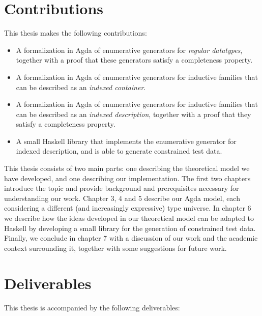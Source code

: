 \documentclass[a4paper,msc,twosized=semi]{uustthesis}
\let\oldemph\emph
\renewcommand\emph[1]{{\large\oldemph{#1}}}
\begin{document}
\section{Contributions}

  This thesis makes the following contributions: 

  \begin{itemize}
    \item 
      A formalization in Agda of enumerative generators for \emph{regular datatypes}, 
      together with a proof that these generators satisfy a completeness property. 

    \item 
      A formalization in Agda of enumerative generators for inductive families that 
      can be described as an \emph{indexed container}. 

    \item 
      A formalization in Agda of enumerative generators for inductive families that 
      can be described as an \emph{indexed description}, together with a proof that 
      they satisfy a completeness property. 

    \item 
      A small Haskell library that implements the enumerative generator for indexed 
      description, and is able to generate constrained test data. 
  \end{itemize}

  This thesis consists of two main parts: one describing the theoretical model we have 
  developed, and one describing our implementation. The first two chapters introduce 
  the topic and provide background and prerequisites necessary for understanding our 
  work. Chapter 3, 4 and 5 describe our Agda model, each considering a different (and
  increasingly expressive) type universe. In chapter 6 we describe how the ideas 
  developed in our theoretical model can be adapted to Haskell 
  by developing a small library for the generation of constrained test data. Finally, 
  we conclude in chapter 7 with a discussion of our work and the academic context 
  surrounding it, together with some suggestions for future work. 

\section{Deliverables}

  This thesis is accompanied by the following deliverables: 
\end{document}
